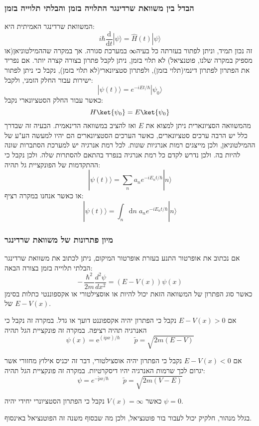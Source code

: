 \documentclass{tstextbook}
\begin{document}
\subsubsection{הבדל בין משוואת שרדינגר התלויה בזמן והבלתי תלוייה בזמן}

המשוואת שרדינגר האמיתית היא:
$$i\hbar{\frac{\mathrm{d}}{\mathrm{d}t}}|\psi\rangle={\hat{H}}(t)|\psi\rangle$$
זה נכון תמיד, וניתן לפתור בעזרתה כל בעיה∞ במערכת סגורה. אך במקרה שההמילטוניאן(או מספיק במקרה שלנו, פוטנציאל) לא תלוי בזמן, ניתן לקבל פתרון בצורה קצרה יותר. אם נפריד את הפתרון לפתרון דינמי(תלוי בזמן), ולפתרון סטציונארי(לא תלוי בזמן), נקבל כי ניתן לפתור ישירות עבור החלק הזמני, ולקבל:
$$|\psi(t)\rangle=e^{-i E t/\hbar}|\psi_{0}\rangle$$
כאשר עבור החלק הסטציונארי נקבל:
$$H\ket{\psi_{0}} =E\ket{\psi_{0}} $$
מהמשוואה הסציונארית ניתן למצוא את \(E\) ואז להציב במשוואה הדינאמית. הבעיה זה שבדרך כלל יש הרבה ערכים סטציונארים, כאשר הערכים הסטציונארים הם יהיו למעשה הע"ע של ההמילטוניאן, ולכן מייצגים רמות אנרגיות שונות. לכל רמת אנרגיה יש למערכת הסתברות שונה להיות בה. ולכן נדרש לקדם כל רמת אנרגיה בנפרד בהתאם להסתרות שלה. ולכן נקבל כי ההתקדמות של הפונקציית גל תהיה:
$$|\psi(t)\rangle=\sum_{n}a_{n}e^{-i E_{n}t/\hbar}|n\rangle$$
או כאשר אנחנו במקרה רציף:
$$|\psi(t)\rangle=\int_{n}\mathrm{d}n\;a_{n}e^{-i E_{n}t/\hbar}|n\rangle$$

\subsubsection{מיון פתרונות של משוואת שרדינגר}

אם נכתוב את אופרטור התנע בעזרת אופרטור המיקום, ניתן לכתוב את משוואת שרדינגר הבלתי תלוייה בזמן בצורה הבאה:
$$-\,\frac{\hbar^{2}}{2m}\frac{d^{2}\psi}{d x^{2}}=(E-V(x))\psi(x)$$
כאשר סוג הפתרון של המשוואה הזאת יכול להיות או אוסצילטורי או אקספוננטי כתלות בסימן של \(E-V(x)\).

\begin{proposition}
אם \(E-V(x)>0\) נקבל כי הפתרון יהיה אקספוננט דועך או גדל. במקרה זה נקבל כי האנרגיה תהיה רציפה. במקרה זה פונקציית הגל תהיה
$$\psi(x)=\mathrm{e}^{(i p x)/\hbar} \qquad \tilde{p}=\sqrt{2m(E-V)}$$

\end{proposition}
\begin{proposition}
אם \(E-V(x)<0\) נקבל כי הפתרון יהיה אוסצילטורי, דבר זה יכניס אילוץ מחזורי אשר יגרום לכך שרמות האנרגיה יהיו דיסקרטיות. במקרה זה פונקציית הגל תהיה:
$$\psi=e^{ -\tilde{p}x/\hbar }\qquad \tilde{p}=\sqrt{ 2m(V-E) }$$

\end{proposition}
\begin{proposition}
כאשר \(V(x)=\infty\) נקבל כי הפתרון הסטציונרי יחידי יהיה \(\psi=0\).

\end{proposition}
בגלל מנהור, חלקיק יכול לעבור בור פוטנציאל, ולכן מה שבסוף משנה זה הפוטנציאל באינסוף.
\end{document}
